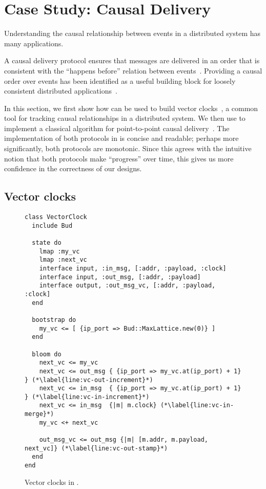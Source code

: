 \section{Case Study: Causal Delivery}
\label{sec:causal}
Understanding the causal relationship between events in a distributed system has
many applications.

A causal delivery protocol ensures that messages are delivered in an order that
is consistent with the ``happens before'' relation between
events~\cite{Lamport1978}. Providing a causal order over events has been
identified as a useful building block for loosely consistent distributed
applications~\cite{Lloyd2011}.

In this section, we first show how \lang can be used to build vector
clocks~\cite{Fidge1988,Mattern1989}, a common tool for tracking causal
relationships in a distributed system. We then use \lang to implement a
classical algorithm for point-to-point causal delivery~\cite{Schiper1989}. The
implementation of both protocols in \lang is concise and readable; perhaps more
significantly, both protocols are monotonic. Since this agrees with the
intuitive notion that both protocols make ``progress'' over time, this gives us
more confidence in the correctness of our designs.

\subsection{Vector clocks}
\begin{figure}[t]
\begin{scriptsize}
\begin{lstlisting}
class VectorClock
  include Bud

  state do
    lmap :my_vc
    lmap :next_vc
    interface input, :in_msg, [:addr, :payload, :clock]
    interface input, :out_msg, [:addr, :payload]
    interface output, :out_msg_vc, [:addr, :payload, :clock]
  end

  bootstrap do
    my_vc <= [ {ip_port => Bud::MaxLattice.new(0)} ]
  end

  bloom do
    next_vc <= my_vc
    next_vc <= out_msg { {ip_port => my_vc.at(ip_port) + 1} } (*\label{line:vc-out-increment}*)
    next_vc <= in_msg  { {ip_port => my_vc.at(ip_port) + 1} } (*\label{line:vc-in-increment}*)
    next_vc <= in_msg  {|m| m.clock} (*\label{line:vc-in-merge}*)
    my_vc <+ next_vc

    out_msg_vc <= out_msg {|m| [m.addr, m.payload, next_vc]} (*\label{line:vc-out-stamp}*)
  end
end
\end{lstlisting}
\end{scriptsize}
\caption{Vector clocks in \lang.}
\label{fig:vector-clock-src}
\end{figure}

